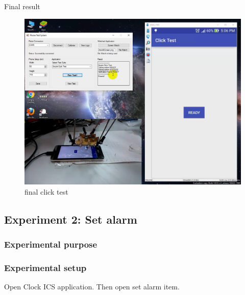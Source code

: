 Final result
	\begin{figure}[H]
		\centering
		\includegraphics[scale=0.5]{Chapters/Fig/click_final.png}
		\caption{final click test}
		\label{fig:click_final}
	\end{figure}

\subsection{Experiment 2: Set alarm}
\subsubsection{Experimental purpose}

\subsubsection{Experimental setup}
Open Clock ICS application. Then open set alarm item.

